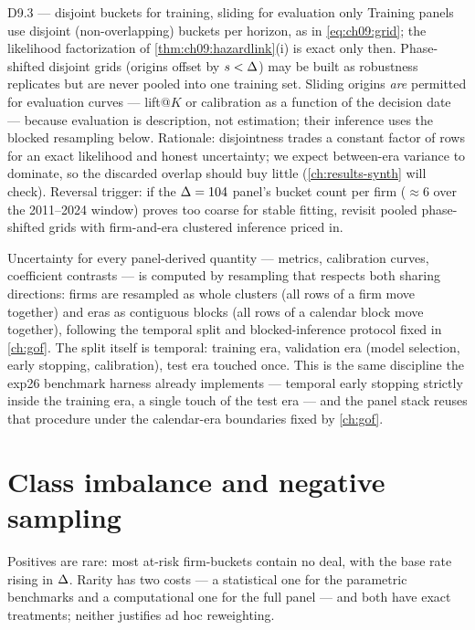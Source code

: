 \begin{decision}{D9.3 --- disjoint buckets for training, sliding for
evaluation only}
Training panels use disjoint (non-overlapping) buckets per horizon, as
in \cref{eq:ch09:grid}; the likelihood factorization of
\cref{thm:ch09:hazardlink}(i) is exact only then. Phase-shifted disjoint
grids (origins offset by $s < \Delta$) may be built as robustness
replicates but are never pooled into one training set. Sliding origins
\emph{are} permitted for evaluation curves --- lift@$K$ or calibration
as a function of the decision date --- because evaluation is
description, not estimation; their inference uses the blocked resampling
below. Rationale: disjointness trades a constant factor of rows for an
exact likelihood and honest uncertainty; we expect between-era variance
to dominate, so the discarded overlap should buy little
(\cref{ch:results-synth} will check). Reversal trigger: if the $\Delta=104$
panel's bucket count per firm ($\approx 6$ over the 2011--2024 window)
proves too coarse for stable fitting, revisit pooled phase-shifted grids
with firm-and-era clustered inference priced in.
\end{decision}

Uncertainty for every panel-derived quantity --- metrics, calibration
curves, coefficient contrasts --- is computed by resampling that
respects both sharing directions: firms are resampled as whole clusters
(all rows of a firm move together) and eras as contiguous blocks (all
rows of a calendar block move together), following the temporal split
and blocked-inference protocol fixed in \cref{ch:gof}. The split itself
is temporal: training era, validation era (model selection, early
stopping, calibration), test era touched once. This is the same
discipline the exp26 benchmark harness already implements ---
temporal early stopping strictly inside the training era, a single
touch of the test era --- and the panel stack reuses that procedure
under the calendar-era boundaries fixed by \cref{ch:gof}.

\section{Class imbalance and negative sampling}\label{ch09:sec:sampling}

Positives are rare: most at-risk firm-buckets contain no deal, with the
base rate rising in $\Delta$. Rarity has two costs --- a statistical
one for the parametric benchmarks and a computational one for the full
panel --- and both have exact treatments; neither justifies ad hoc
reweighting.

